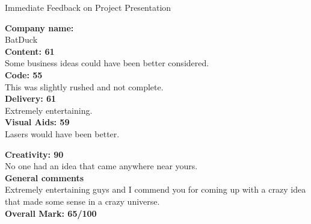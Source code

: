\documentclass{article}
\begin{document}
\begin{center}
\Huge{Immediate Feedback on Project Presentation}\\
\end{center}


\normalsize
\textbf{Company name:}\\

BatDuck \\

\textbf{Content: 61}\\

Some business ideas could have been better considered.\\

\textbf{Code: 55}\\

This was slightly rushed and not complete.\\

\textbf{Delivery: 61}\\

Extremely entertaining.\\

\textbf{Visual Aids: 59}\\

Lasers would have been better.

\textbf{Creativity: 90}\\

No one had an idea that came anywhere near yours.\\

\textbf{General comments}\\

Extremely entertaining guys and I commend you for coming up with a crazy idea that made some sense in a crazy universe.\\

\textbf{Overall Mark: 65/100}
\end{document}
